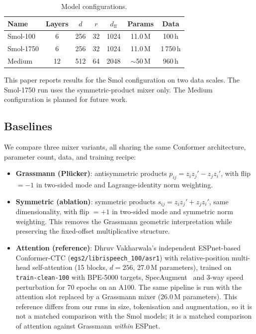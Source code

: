 \documentclass[11pt,a4paper]{article}
\newcommand{\plucker}{Pl\"{u}cker}
\begin{document}
\begin{table}[h]
\centering
\caption{Model configurations.}
\label{tab:configs}
\begin{tabular}{lcccccc}
\toprule
Name & Layers & $d$ & $r$ & $d_{\mathrm{ff}}$ & Params & Data \\
\midrule
Smol-100 & 6 & 256 & 32 & 1024 & 11.0\,M & 100\,h \\
Smol-1750 & 6 & 256 & 32 & 1024 & 11.0\,M & 1\,750\,h \\
Medium & 12 & 512 & 64 & 2048 & $\sim$50\,M & 960\,h \\
\bottomrule
\end{tabular}
\end{table}

This paper reports results for the Smol configuration on two data
scales.  The Smol-1750 run uses the symmetric-product mixer only.  The
Medium configuration is planned for future work.

\subsection{Baselines}

We compare three mixer variants, all sharing the same Conformer
architecture, parameter count, data, and training recipe:

\begin{itemize}
  \item \textbf{Grassmann (\plucker{})}: antisymmetric products
    $p_{ij} = z_i z_j' - z_j z_i'$, with flip $= -1$ in two-sided
    mode and Lagrange-identity norm weighting.
  \item \textbf{Symmetric (ablation)}: symmetric products
    $s_{ij} = z_i z_j' + z_j z_i'$, same dimensionality, with flip
    $= +1$ in two-sided mode and symmetric norm weighting.  This
    removes the Grassmann geometric interpretation while preserving
    the fixed-offset multiplicative structure.
  \item \textbf{Attention (reference)}: Dhruv Vakharwala's independent
    ESPnet-based Conformer-CTC (\texttt{egs2/librispeech\_100/asr1})
    with relative-position multi-head self-attention (15 blocks,
    $d=256$, 27.0\,M parameters), trained on \texttt{train-clean-100}
    with BPE-5000 targets, SpecAugment~\citep{park2019specaugment} and
    3-way speed perturbation for 70 epochs on an A100.  The same
    pipeline is run with the attention slot replaced by a Grassmann
    mixer (26.0\,M parameters).  This reference differs from our runs in
    size, tokenisation and augmentation, so it is not a matched
    comparison with the Smol models; it is a matched comparison of
    attention against Grassmann \emph{within} ESPnet.
\end{itemize}
\end{document}
